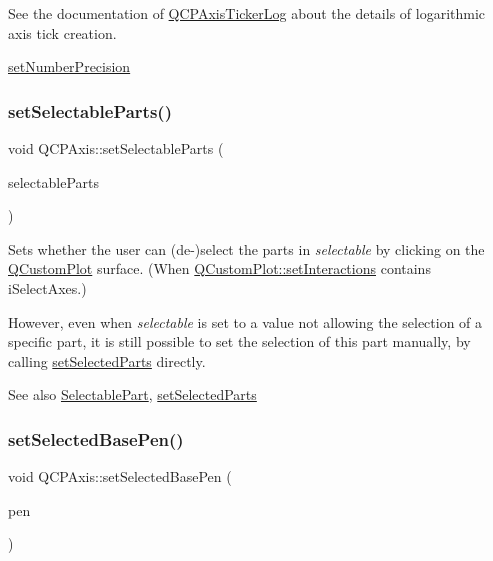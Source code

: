 \begin{DoxyCodeInclude}
\end{DoxyCodeInclude}
 See the documentation of \hyperlink{classQCPAxisTickerLog}{Q\+C\+P\+Axis\+Ticker\+Log} about the details of logarithmic axis tick creation.

\hyperlink{classQCPAxis_a21dc8023ad7500382ad9574b48137e63}{set\+Number\+Precision} \mbox{\label{classQCPAxis_a513f9b9e326c505d9bec54880031b085}} 
\subsubsection{\texorpdfstring{set\+Selectable\+Parts()}{setSelectableParts()}}
{\footnotesize\ttfamily void Q\+C\+P\+Axis\+::set\+Selectable\+Parts (\begin{DoxyParamCaption}\item[{const Q\+C\+P\+Axis\+::\+Selectable\+Parts \&}]{selectable\+Parts }\end{DoxyParamCaption})}

Sets whether the user can (de-\/)select the parts in {\itshape selectable} by clicking on the \hyperlink{classQCustomPlot}{Q\+Custom\+Plot} surface. (When \hyperlink{classQCustomPlot_a5ee1e2f6ae27419deca53e75907c27e5}{Q\+Custom\+Plot\+::set\+Interactions} contains i\+Select\+Axes.)

However, even when {\itshape selectable} is set to a value not allowing the selection of a specific part, it is still possible to set the selection of this part manually, by calling \hyperlink{classQCPAxis_ab9d7a69277dcbed9119b3c1f25ca19c3}{set\+Selected\+Parts} directly.

\begin{DoxySeeAlso}{See also}
\hyperlink{classQCPAxis_abee4c7a54c468b1385dfce2c898b115f}{Selectable\+Part}, \hyperlink{classQCPAxis_ab9d7a69277dcbed9119b3c1f25ca19c3}{set\+Selected\+Parts} 
\end{DoxySeeAlso}
\mbox{\label{classQCPAxis_aeb917a909215605b95ef2be843de1ee8}} 
\subsubsection{\texorpdfstring{set\+Selected\+Base\+Pen()}{setSelectedBasePen()}}
{\footnotesize\ttfamily void Q\+C\+P\+Axis\+::set\+Selected\+Base\+Pen (\begin{DoxyParamCaption}\item[{const Q\+Pen \&}]{pen }\end{DoxyParamCaption})}

